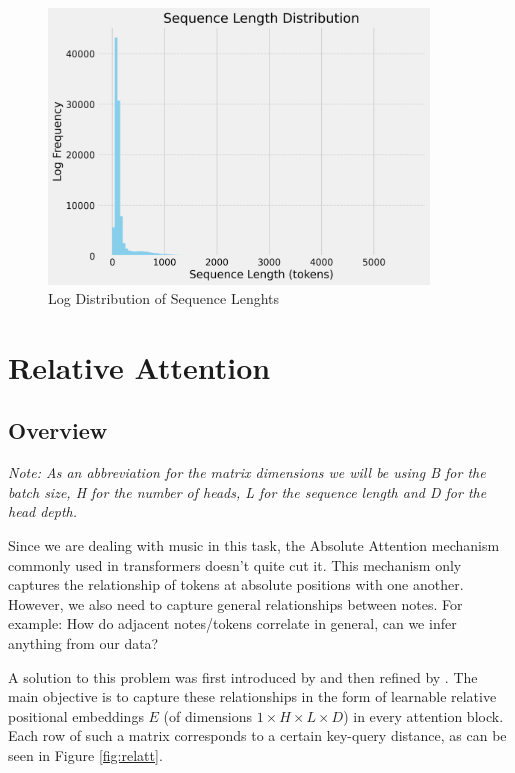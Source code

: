 \documentclass[a4paper,12pt]{extarticle}
\begin{document}
\begin{figure}[H]
    \centering
    \includegraphics[width=0.9\textwidth]{visualization_4096_REMI_train_manual_tokens_True_random_padding_True_seq_length_distribution.png}
    \caption{Log Distribution of Sequence Lenghts}
    \label{fig:log_seq_len}
\end{figure}


\section{Relative Attention}
\subsection{Overview}

\textit{Note: As an abbreviation for the matrix dimensions we will be using B for the batch size, H for the number of heads, L for the sequence length and D for the head depth.} \newline

Since we are dealing with music in this task, the Absolute Attention mechanism commonly used in transformers \parencite{DBLP:journals/corr/VaswaniSPUJGKP17} doesn't quite cut it. This mechanism only captures the relationship of tokens at absolute positions with one another. However, we also need to capture general relationships between notes. For example: How do adjacent notes/tokens correlate in general, can we infer anything from our data? \newline

A solution to this problem was first introduced by \textcite{shaw2018selfattentionrelativepositionrepresentations} and then refined by \textcite{DBLP:journals/corr/abs-1809-04281}. The main objective is to capture these relationships in the form of learnable relative positional embeddings $E$ (of dimensions $1 \times H \times L \times D$) in every attention block. Each row of such a matrix corresponds to a certain key-query distance, as can be seen in Figure \ref{fig:relatt}. 
\newline
\end{document}
